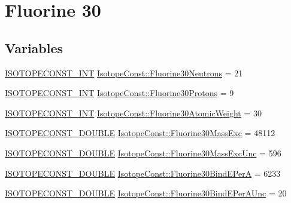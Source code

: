 \hypertarget{group___isotope_const-_fluorine-_f30}{}\section{Fluorine 30}
\label{group___isotope_const-_fluorine-_f30}
\subsection*{Variables}
\begin{DoxyCompactItemize}
\item 
\mbox{\hyperlink{group___isotope_const-_macros_ga5f18360b3e99483a35c32d789e62621c}{I\+S\+O\+T\+O\+P\+E\+C\+O\+N\+S\+T\+\_\+\+I\+NT}} \mbox{\hyperlink{group___isotope_const-_fluorine-_f30_gaa44a45ceae40ac0081701b81c0a8cbdd}{Isotope\+Const\+::\+Fluorine30\+Neutrons}} = 21
\item 
\mbox{\hyperlink{group___isotope_const-_macros_ga5f18360b3e99483a35c32d789e62621c}{I\+S\+O\+T\+O\+P\+E\+C\+O\+N\+S\+T\+\_\+\+I\+NT}} \mbox{\hyperlink{group___isotope_const-_fluorine-_f30_ga4e4f79e7317033e610b3343291ec93bf}{Isotope\+Const\+::\+Fluorine30\+Protons}} = 9
\item 
\mbox{\hyperlink{group___isotope_const-_macros_ga5f18360b3e99483a35c32d789e62621c}{I\+S\+O\+T\+O\+P\+E\+C\+O\+N\+S\+T\+\_\+\+I\+NT}} \mbox{\hyperlink{group___isotope_const-_fluorine-_f30_ga2f4d2902ff874d109096e1e7e1546176}{Isotope\+Const\+::\+Fluorine30\+Atomic\+Weight}} = 30
\item 
\mbox{\hyperlink{group___isotope_const-_macros_ga8f45a7272ce02c0b4c65c44636ed719a}{I\+S\+O\+T\+O\+P\+E\+C\+O\+N\+S\+T\+\_\+\+D\+O\+U\+B\+LE}} \mbox{\hyperlink{group___isotope_const-_fluorine-_f30_ga4876addf8ff730681ed0e3555e026bb5}{Isotope\+Const\+::\+Fluorine30\+Mass\+Exc}} = 48112
\item 
\mbox{\hyperlink{group___isotope_const-_macros_ga8f45a7272ce02c0b4c65c44636ed719a}{I\+S\+O\+T\+O\+P\+E\+C\+O\+N\+S\+T\+\_\+\+D\+O\+U\+B\+LE}} \mbox{\hyperlink{group___isotope_const-_fluorine-_f30_gac7f4912170d25a135cac0473db606a7a}{Isotope\+Const\+::\+Fluorine30\+Mass\+Exc\+Unc}} = 596
\item 
\mbox{\hyperlink{group___isotope_const-_macros_ga8f45a7272ce02c0b4c65c44636ed719a}{I\+S\+O\+T\+O\+P\+E\+C\+O\+N\+S\+T\+\_\+\+D\+O\+U\+B\+LE}} \mbox{\hyperlink{group___isotope_const-_fluorine-_f30_gac26230a6e05b16419f04b29bd52f7166}{Isotope\+Const\+::\+Fluorine30\+Bind\+E\+PerA}} = 6233
\item 
\mbox{\hyperlink{group___isotope_const-_macros_ga8f45a7272ce02c0b4c65c44636ed719a}{I\+S\+O\+T\+O\+P\+E\+C\+O\+N\+S\+T\+\_\+\+D\+O\+U\+B\+LE}} \mbox{\hyperlink{group___isotope_const-_fluorine-_f30_ga2bad0e97933f91714fd0708cdd07e9ab}{Isotope\+Const\+::\+Fluorine30\+Bind\+E\+Per\+A\+Unc}} = 20

\end{DoxyCompactItemize}
